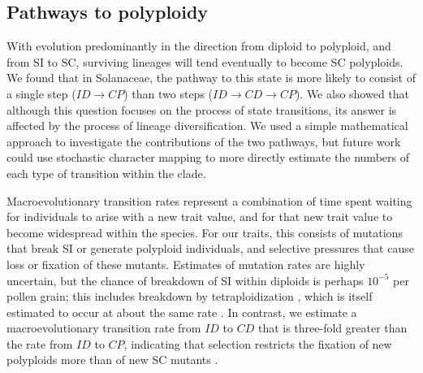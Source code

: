 \subsection{Pathways to polyploidy}

With evolution predominantly in the direction from diploid to polyploid, and from SI to SC, surviving lineages will tend eventually to become SC polyploids.
We found that in Solanaceae, the pathway to this state is more likely to consist of a single step ($ID \rightarrow CP$) than two steps ($ID \rightarrow CD \rightarrow CP$).
We also showed that although this question focuses on the process of state transitions, its answer is affected by the process of lineage diversification.
We used a simple mathematical approach to investigate the contributions of the two pathways, but future work could use stochastic character mapping to more directly estimate the numbers of each type of transition within the clade.

Macroevolutionary transition rates represent a combination of time spent waiting for individuals to arise with a new trait value, and for that new trait value to become widespread within the species.
For our traits, this consists of mutations that break SI or generate polyploid individuals, and selective pressures that cause loss or fixation of these mutants.
Estimates of mutation rates are highly uncertain, but the chance of breakdown of SI within diploids is perhaps $10^{-5}$ per pollen grain; this includes breakdown by tetraploidization \citep{lewis1979}, which is itself estimated to occur at about the same rate \citep{ramsey_1998}.  %
In contrast, we estimate a macroevolutionary transition rate from $ID$ to $CD$ that is three-fold greater than the rate from $ID$ to $CP$, indicating that selection restricts the fixation of new polyploids more than of new SC mutants \citep{robertson_2011}. %

